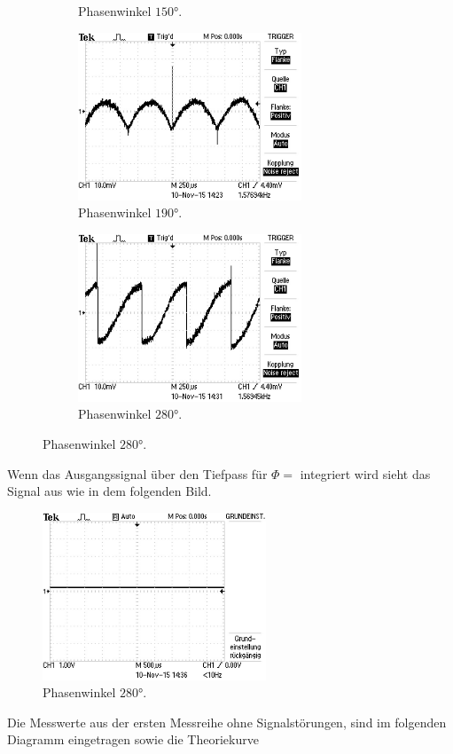 \begin{figure}
\begin{subfigure}{0.48\textwidth}
\caption{Phasenwinkel $150°$.}
\label{fig:orp150}
\end{subfigure}
\begin{subfigure}{0.48\textwidth}
\centering
\includegraphics[height=5cm]{Bilder/or/or190.JPG}
\caption{Phasenwinkel $190°$.}
\label{fig:orp190}
\end{subfigure}
\begin{subfigure}{0.48\textwidth}
\centering
\includegraphics[height=5cm]{Bilder/or/or280.JPG}
\caption{Phasenwinkel $280°$.}
\label{fig:orp280}
\end{subfigure}
\end{figure}
Wenn das Ausgangssignal über den Tiefpass für $\Phi=$ integriert wird sieht das
Signal aus wie in dem folgenden Bild.
\begin{figure}
  \centering
  \includegraphics[height=5cm]{Bilder/int/INT.JPG}
  \caption{Phasenwinkel $280°$.}
  \label{fig:int}
\end{figure}
Die Messwerte aus der ersten Messreihe ohne Signalstörungen, sind im folgenden
Diagramm eingetragen sowie die Theoriekurve
